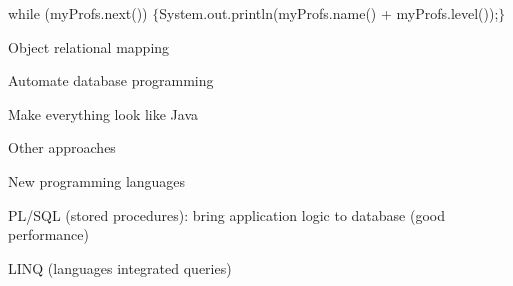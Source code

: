 		\item while (myProfs.next()) $\{$System.out.println(myProfs.name() + myProfs.level());$\}$
	\enumend
	\item Object relational mapping
	\enumstart
		\item Automate database programming
		\item Make everything look like Java
	\enumend
	\item Other approaches
	\enumstart
		\item New programming languages
		\item PL/SQL (stored procedures): bring application logic to database (good performance)
		\item LINQ (languages integrated queries)
	\enumend
\enumend
